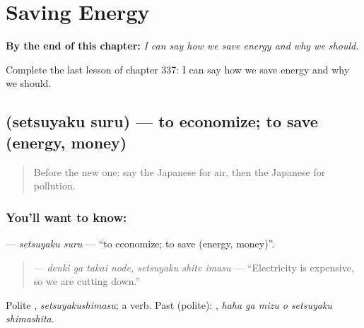 
\chapter{Saving Energy}
\label{ch:ja-saving-energy}

\begin{chapteropening}
\textbf{By the end of this chapter:} \emph{I can say how we save energy and why we should.}

Complete the last lesson of chapter 337: I can say how we save energy and why we should.
\end{chapteropening}

\section[\texorpdfstring{\ja{せつやくする} (setsuyaku suru)}{せつやくする (setsuyaku suru)}]{ (setsuyaku suru) — to economize; to save (energy, money)}

\label{lesson:JA-C337-setsuyaku-suru}



\begin{quote}
Before the new one: say the Japanese for air, then the Japanese for pollution.
\end{quote}

\subsection*{You'll want to know: }
\textbf{} — \emph{setsuyaku suru} — \textquotedblleft{}to economize; to save (energy, money)\textquotedblright{}.

\begin{quote}
\textbf{ } — \emph{denki ga takai node, setsuyaku shite imasu} — \textquotedblleft{}Electricity is expensive, so we are cutting down.\textquotedblright{}
\end{quote}

Polite \textbf{}, \emph{setsuyakushimasu}; a  verb. Past (polite): \textbf{  }, \emph{haha ga mizu o setsuyaku shimashita}.

